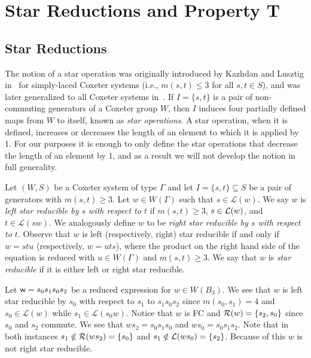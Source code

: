 \chapter{Star Reductions and Property T}


\section{Star Reductions}\label{sec:star}

The notion of a star operation was originally introduced by Kazhdan and Lusztig in~\cite{Kazhdan1979} for simply-laced Coxeter systems (i.e., $m(s,t) \leq 3$ for all $s,t \in S$), and was later generalized to all Coxeter systems in~\cite{Lusztig1985}. If $I=\{s,t\}$ is a pair of non-commuting generators of a Coxeter group $W$, then $I$ induces four partially defined maps from $W$ to itself, known as \emph{star operations}. A star operation, when it is defined, increases or decreases the length of an element to which it is applied by 1. For our purposes it is enough to only define the star operations that decrease the length of an element by 1, and as a result we will not develop the notion in full generality.

Let $(W,S)$ be a Coxeter system of type $\Gamma$ and let $I=\{s,t\}\subseteq S$ be a pair of generators with $m(s,t) \geq 3$. Let $w \in W(\Gamma)$ such that $s \in \mathcal{L}(w)$. We say $w$ is \emph{left star reducible by $s$ with respect to $t$} if $m(s,t) \geq 3$, $s \in \mathcal{L}(w)$, and $t \in \mathcal{L}(sw)$. We analogously define $w$ to be \emph{right star reducible by $s$ with respect to $t$}. Observe that $w$ is left (respectively, right) star reducible if and only if $w=stu$ (respectively, $w=uts$), where the product on the right hand side of the equation is reduced with $u \in W(\Gamma)$ and $m(s,t) \geq 3$. We say that $w$ is \emph{star reducible} if it is either left or right star reducible.

\begin{example}\label{ex:starred}
Let $\mathsf{w}=s_0s_1s_0s_2$ be a reduced expression for $w \in W(B_3)$. We see that $w$ is left star reducible by $s_0$ with respect to $s_1$ to $s_1s_0s_2$ since $m(s_0,s_1)=4$ and $s_0 \in \mathcal{L}(w)$ while $s_1 \in \mathcal{L}(s_0w)$. Notice that $w$ is FC and $\mathcal{R}(w)=\{s_2,s_0\}$ since $s_0$ and $s_2$ commute. We see that $ws_2=s_0s_1s_0$ and $ws_0=s_0s_1s_2$. Note that in both instances $s_1 \notin \mathcal{R}(ws_2)=\{s_0\}$ and $s_1 \notin \mathcal{L}(ws_0)=\{s_2\}$. Because of this $w$ is not right star reducible. 
\end{example}

